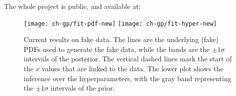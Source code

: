The whole project is public, and available at:
\begin{center}
\end{center}


\begin{figure}
	\centering
	\texttt{[image: ch-gp/fit-pdf-new]}
	\texttt{[image: ch-gp/fit-hyper-new]}
  \caption{
    Current \lsqfitgp results on fake data.
    The lines are the underlying (fake) PDFs used to generate the fake data,
    while the bands are the $\pm 1\sigma$ intervals of the posterior.
    The vertical dashed lines mark the start of the $x$ values that are linked to the data. 
    The lower plot shows the inference over the hyperparameters, with the gray
    band representing the $\pm 1\sigma$ intervals of the prior.
  }
	\label{fig:gp/mcpdf}
\end{figure}
